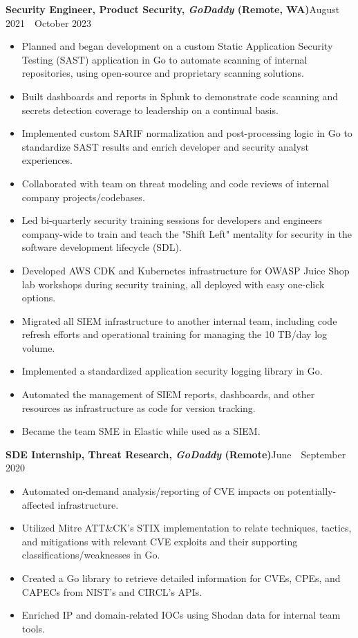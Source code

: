 \documentclass[12pt]{article}
\renewcommand\Large{\fontsize{16.5}{18}}
\newcommand{\sepspacing}{1.25em}
\newcommand{\halfsepspacing}{1em}
\newcommand{\itemspacing}{1pt}
\newcommand{\sep}{
  \vspace{\sepspacing}
}
\newcommand{\resumesection}[1]{
  \sep
  \noindent\Large{\textbf{#1}}\hfill\normalsize
}
\newcommand{\resumelistitem}[1]{
  \item{\fontsize{11.5}{18}#1}
}
\newcommand{\resumejobtitle}[5]{
  \vspace{\halfsepspacing}
  \noindent\normalsize{\textbf{#1, \textit{#2} (#3)}}\hfill\small{#4~\textemdash~#5}
}
\begin{document}
  \pagestyle{resumeheader}

  \resumesection{Professional Experience}

    \resumejobtitle{Security Engineer, Product Security}{GoDaddy}{Remote, WA}{August 2021}{October 2023}

    \begin{itemize}
      \setlength{\itemsep}{\itemspacing}
      \resumelistitem{Planned and began development on a custom Static Application Security Testing (SAST)
        application in Go to automate scanning of internal repositories,
        using open-source and proprietary scanning solutions.}
      \resumelistitem{Built dashboards and reports in Splunk to demonstrate code scanning and secrets detection
        coverage to leadership on a continual basis.}
      \resumelistitem{Implemented custom SARIF normalization and post-processing logic in Go
        to standardize SAST results and enrich developer and security analyst experiences.}
      \resumelistitem{Collaborated with team on threat modeling and code reviews of internal company projects/codebases.}
      \resumelistitem{Led bi-quarterly security training sessions for developers and engineers company-wide to train and teach
        the "Shift Left" mentality for security in the software development lifecycle (SDL).}
      \resumelistitem{Developed AWS CDK and Kubernetes infrastructure for OWASP Juice Shop lab workshops during security training,
        all deployed with easy one-click options.}
      \resumelistitem{Migrated all SIEM infrastructure to another internal team,
        including code refresh efforts and operational training for managing the 10 TB/day log volume.}
      \resumelistitem{Implemented a standardized application security logging library in Go.}
      \resumelistitem{Automated the management of SIEM reports, dashboards, and other resources as infrastructure as code for version tracking.}
      \resumelistitem{Became the team SME in Elastic while used as a SIEM.}
    \end{itemize}

    \resumejobtitle{SDE Internship, Threat Research}{GoDaddy}{Remote}{June}{September 2020}

    \begin{itemize}
      \setlength{\itemsep}{\itemspacing}
      \resumelistitem{Automated on-demand analysis/reporting of CVE impacts on potentially-affected infrastructure.}
      \resumelistitem{Utilized Mitre ATT\&CK's STIX implementation to relate
        techniques, tactics, and mitigations with relevant CVE
        exploits and their supporting classifications/weaknesses in Go.}
      \resumelistitem{Created a Go library to retrieve detailed information for
        CVEs, CPEs, and CAPECs from NIST's and CIRCL's APIs.}
      \resumelistitem{Enriched IP and domain-related IOCs using Shodan data for internal team tools.}
    \end{itemize}
\end{document}
